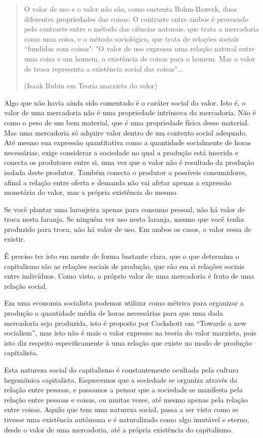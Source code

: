 \begin{quote}
O valor de uso e o valor não são, como sustenta Bohm-Bawerk, duas diferentes propriedades das coisas. O contraste entre ambos é provocado pelo contraste entre o método das ciências naturais, que trata a mercadoria como uma coisa, e o método sociológico, que trata de relações sociais “fundidas com coisas". "O valor de uso expressa uma relação natural entre uma coisa e um homem, a existência de coisas para o homem. Mas o valor de troca representa a existência social das coisas"...

(Isaak Rubin em Teoria marxista do valor)
\end{quote}

Algo que não havia ainda sido comentado é o caráter social do valor. Isto é, o valor de uma mercadoria não é uma propriedade intrínseca da mercadoria. Não é como o peso de um bem material, que é uma propriedade física desse material. Mas uma mercadoria só adquire valor dentro de um contexto social adequado. Até mesmo sua expressão quantitativa como a quantidade socialmente de horas necessárias, exige considerar a sociedade no qual a produção está inserida e conecta os produtores entre si, uma vez que o valor não é resultado da produção isolada deste produtor. Também conecta o produtor a possíveis consumidores, afinal a relação entre oferta e demanda não vai afetar apenas a expressão monetária do valor, mas a própria existência do mesmo.

Se você plantar uma laranjeira apenas para consumo pessoal, não há valor de troca nesta laranja. Se ninguém ver uso nesta laranja, mesmo que você tenha produzido para troca, não há valor de uso. Em ambos os casos, o valor cessa de existir. 

É preciso ter isto em mente de forma bastante clara, que o que determina o capitalismo são as relações sociais de produção, que são em si relações sociais entre indivíduos. Como visto, o próprio valor de uma mercadoria é fruto de uma relação social.

Em uma economia socialista podemos utilizar como métrica para organizar a produção a quantidade média de horas necessárias para que uma dada mercadoria seja produzida, isto é proposto por Cockshott em “Towards a new socialism”, mas isto não é mais o valor expresso na teoria do valor marxista, pois isto diz respeito especificamente à uma relação que existe no modo de produção capitalista.

Esta natureza social do capitalismo é constantemente ocultada pela cultura hegemônica capitalista. Esquecemos que a sociedade se organiza através da relação entre pessoas, e passamos a pensar que a sociedade se manifesta pela relação entre pessoas e coisas, ou muitas vezes, até mesmo apenas pela relação entre coisas. Aquilo que tem uma natureza social, passa a ser vista como se tivesse uma existência autônoma e é naturalizado como algo imutável e eterno, desde o valor de uma mercadoria, até a própria existência do capitalismo.

